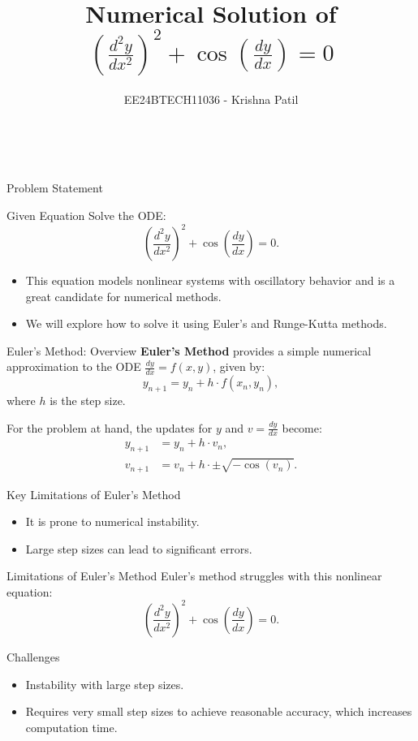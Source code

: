 \documentclass{beamer}
\title{Numerical Solution of \((\frac{d^2y}{dx^2})^2 + \cos\left(\frac{dy}{dx}\right) = 0\)}
\author{EE24BTECH11036 - Krishna Patil}
\date{}
\newcommand{\backgroundframe}{
    \begin{frame}[plain]
        \
        \titlepage
    \end{frame}
}
\begin{document}
\backgroundframe

\begin{frame}{Problem Statement}
\begin{block}{Given Equation}
Solve the ODE:
\[
\left(\frac{d^2y}{dx^2}\right)^2 + \cos\left(\frac{dy}{dx}\right) = 0.
\]
\end{block}

\begin{itemize}
    \item This equation models nonlinear systems with oscillatory behavior and is a great candidate for numerical methods.
    \item We will explore how to solve it using Euler's and Runge-Kutta methods.
\end{itemize}
\end{frame}

\begin{frame}[t]{Euler's Method: Overview}
\textbf{Euler's Method} provides a simple numerical approximation to the ODE \( \frac{dy}{dx} = f(x, y) \), given by:
\[
y_{n+1} = y_n + h \cdot f(x_n, y_n),
\]
where \(h\) is the step size.

For the problem at hand, the updates for \(y\) and \(v = \frac{dy}{dx}\) become:
\begin{align*}
    y_{n+1} &= y_n + h \cdot v_n, \\
    v_{n+1} &= v_n + h \cdot \pm \sqrt{-\cos(v_n)}.
\end{align*}

\begin{alertblock}{Key Limitations of Euler's Method}
\begin{itemize}
    \item It is prone to numerical instability.
    \item Large step sizes can lead to significant errors.
\end{itemize}
\end{alertblock}
\end{frame}

\begin{frame}{Limitations of Euler's Method}
Euler's method struggles with this nonlinear equation:
\[
\left(\frac{d^2y}{dx^2}\right)^2 + \cos\left(\frac{dy}{dx}\right) = 0.
\]

\begin{block}{Challenges}
    \begin{itemize}
        \item Instability with large step sizes.
        \item Requires very small step sizes to achieve reasonable accuracy, which increases computation time.
    \end{itemize}
\end{block}
\end{frame}
\end{document}
